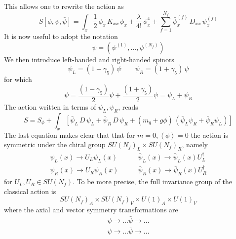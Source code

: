 This allows one to rewrite the action as
\begin{equation*}
    S[\phi,\psi,\bar\psi] = \int_x \frac{1}{2} \, \phi_x \, K_{xx} \, \phi_x + \frac{\lambda}{4!} \, \phi_x^4 + \sum_{f=1}^{N_f} \bar\psi_x^{(f)} \, D_{xx} \, \psi_x^{(f)}
\end{equation*}
It is now useful to adopt the notation 
\begin{equation*}
    \psi = (\psi^{(1)}, \dots, \psi^{(N_f)})
\end{equation*} 
We then introduce left-handed and right-handed spinors
\begin{equation*}
	\psi_L = (1-\gamma_5) \, \psi \qquad \psi_R = (1+\gamma_5) \, \psi
\end{equation*}
for which
\begin{equation*}
	\psi = \frac{(1-\gamma_5)}{2} \psi + \frac{(1+\gamma_5)}{2} \psi = \psi_L + \psi_R
\end{equation*}
The action written in terms of $\psi_L, \psi_R$, reads
\begin{equation}
	S = S_\phi +  \int_x \left[\bar\psi_L \, D \, \psi_L + \bar\psi_R \, D \, \psi_R + (m_q + g\phi) \,  \left(\bar\psi_L\psi_R + \bar\psi_R\psi_L\right)\right]
	\label{eq:action_chirality_explicit}
\end{equation}
The last equation makes clear that that for $m=0,\left\langle\phi\right\rangle = 0$ the action is symmetric under the chiral group $SU(N_f) _L\times SU(N_f)_R$, namely
\begin{equation*}
	\begin{aligned}
		\psi_L(x) \to U_L\psi_L(x) &\qquad \bar\psi_L(x) \to \bar\psi_L(x) U_L^{\dagger} \\
		\psi_R(x) \to U_R\psi_R(x) &\qquad \bar\psi_R(x) \to \bar\psi_R(x) U_R^{\dagger}
	\end{aligned}
\end{equation*}
for $U_L, U_R \in SU(N_f)$. To be more precise, the full invariance group of the classical action is 
\begin{equation*}
    SU(N_f)_A \times SU(N_f)_V \times U(1)_A \times U(1)_V
\end{equation*}
where the axial and vector symmetry transformations are
\begin{equation*}
    \begin{aligned}
        \psi \to \dots \bar\psi \to \dots \\
        \psi \to \dots \bar\psi \to \dots
    \end{aligned}
\end{equation*} 
